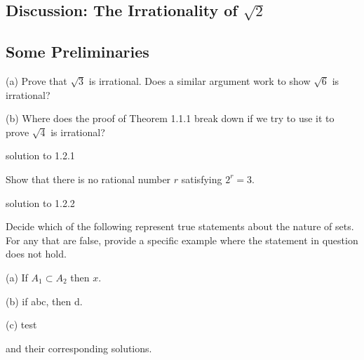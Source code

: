 \documentclass[12pt]{article}
\begin{document}
\subsection{Discussion: The Irrationality of \texorpdfstring{\( \sqrt{2} \)}{Root 2}} 





\subsection{Some Preliminaries}


\begin{exercise}
    \indent
    (a) Prove that \( \sqrt{3} \) is irrational. Does a similar argument work to show \( \sqrt{6} \) is irrational?

    (b) Where does the proof of Theorem 1.1.1\footnotemark{} break down if we try to use it to prove \( \sqrt{4} \) is irrational?
\end{exercise}

\begin{solution}

    solution to 1.2.1
\end{solution}



\begin{exercise}
    Show that there is no rational number \( r \) satisfying \( 2^{r} = 3 \).
\end{exercise}

\begin{solution}
    solution to 1.2.2
\end{solution}




\begin{exercise}
    Decide which of the following represent true statements about the nature of sets. For any that are false, provide a specific example where the statement in question does not hold.

    (a) If \( A_{1} \subset A_{2} \) then \( x \).

    (b) if abc, then d.     

    (c) test
\end{exercise}

\begin{solution}
    and their corresponding solutions.
\end{solution}
\end{document}
